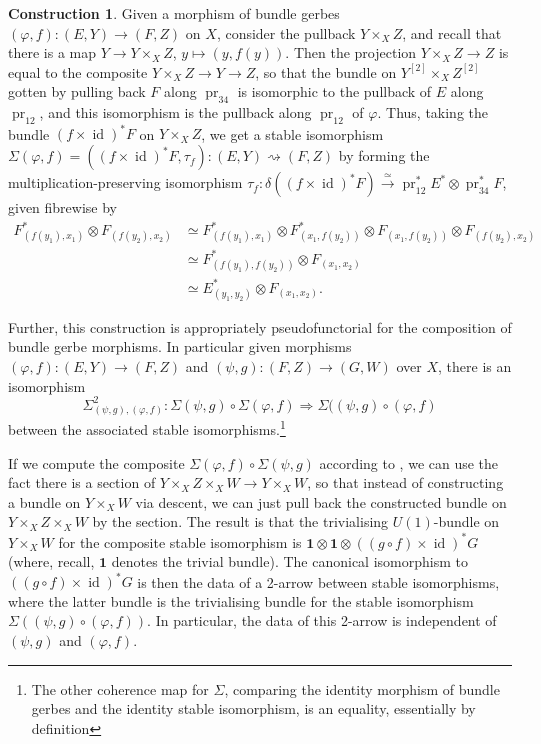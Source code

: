 \documentclass[12pt]{amsart}
\DeclareMathOperator{\id}{id}
\DeclareMathOperator{\pr}{pr}
\theoremstyle{plain}
\theoremstyle{definition}
\newtheorem{construction}[theorem]{Construction}
\theoremstyle{remark}
\numberwithin{equation}{section}
\newcommand{\<}{\langle}
\renewcommand{\>}{\rangle}
\begin{document}
\begin{construction}\label{constr:morphism_to_stable_iso}
Given a morphism of bundle gerbes $(\varphi,f)\colon (E,Y)\to (F,Z)$ on $X$, consider the pullback $Y\times_X Z$, and recall that there is a map $Y\to Y\times_X Z$, $y\mapsto (y,f(y))$. 
Then the projection $Y\times_X Z\to Z$ is equal to the composite $Y\times_X Z \to Y \to Z$, so that the bundle on $Y^{[2]}\times_X Z^{[2]}$ gotten by pulling back $F$ along $\pr_{34}$ is isomorphic to the pullback of $E$ along $\pr_{12}$, and this isomorphism is the pullback along $\pr_{12}$ of $\varphi$. 
Thus, taking the bundle $(f\times \id)^*F$ on $Y\times_X Z$, we get a stable isomorphism $\Sigma(\varphi,f) = ((f\times \id)^*F,\tau_f)\colon (E,Y) \rightsquigarrow (F,Z)$ by forming the multiplication-preserving isomorphism $\tau_f \colon \delta((f\times \id)^*F) \xrightarrow{\simeq} \pr_{12}^*E^*\otimes \pr_{34}^*F$, given fibrewise by
\begin{align*}
	F^*_{(f(y_1),x_1)}\otimes F_{(f(y_2),x_2)} & \simeq F^*_{(f(y_1),x_1)}\otimes F^*_{(x_1,f(y_2))}\otimes F_{(x_1,f(y_2))}\otimes F_{(f(y_2),x_2)} \\
	& \simeq F^*_{(f(y_1),f(y_2))}\otimes F_{(x_1,x_2)}\\
	& \simeq  E^*_{(y_1,y_2)}\otimes F_{(x_1,x_2)}.
\end{align*}

Further, this construction is appropriately pseudofunctorial for the composition of bundle gerbe morphisms. In particular given morphisms $(\varphi,f)\colon (E,Y) \to (F,Z)$ and $(\psi,g)\colon (F,Z)\to (G,W)$ over $X$, there is an isomorphism 
\[
	\Sigma^2_{(\psi,g),(\varphi,f)}\colon \Sigma(\psi,g) \circ\Sigma(\varphi,f) \Rightarrow \Sigma((\psi,g)\circ (\varphi,f)
\]
between the associated stable isomorphisms.\footnote{The other coherence map for $\Sigma$, comparing the identity morphism of bundle gerbes and the identity stable isomorphism, is an equality, essentially by definition}

If we compute the composite $\Sigma(\varphi,f) \circ\Sigma(\psi,g)$ according to \cite[pp 31--32]{StevPhD}, we can use the fact there is a section of $Y\times_X Z\times_X W \to Y\times_X W$, so that instead of constructing a bundle on $Y\times_X W$ via descent, we can just pull back the constructed bundle on $Y\times_X Z\times_X W$ by the section.
The result is that the trivialising $U(1)$-bundle on $Y\times_X W$ for the composite stable isomorphism is $\mathbf{1}\otimes\mathbf{1} \otimes ((g\circ f)\times\id)^*G$ (where, recall, $\mathbf{1}$ denotes the trivial bundle). 
The canonical isomorphism to $((g\circ f)\times\id)^*G$ is then the data of a 2-arrow between stable isomorphisms, where the latter bundle is the trivialising bundle for the stable isomorphism $\Sigma((\psi,g)\circ (\varphi,f))$. 
In particular, the data of this 2-arrow is independent of $(\psi,g)$ and $(\varphi,f)$.
\end{construction}
\end{document}
